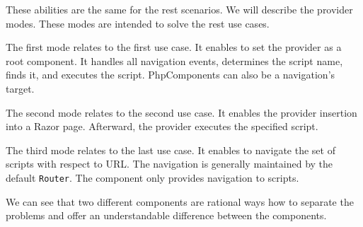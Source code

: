 These abilities are the same for the rest scenarios.
We will describe the provider modes.
These modes are intended to solve the rest use cases. 
\par
The first mode relates to the first use case.
It enables to set the provider as a root component.
It handles all navigation events, determines the script name, finds it, and executes the script.
PhpComponents can also be a navigation's target.
\par
The second mode relates to the second use case.
It enables the provider insertion into a Razor page.
Afterward, the provider executes the specified script.
\par
The third mode relates to the last use case.
It enables to navigate the set of scripts with respect to URL.
The navigation is generally maintained by the default \texttt{Router}.
The component only provides navigation to scripts.
\par
We can see that two different components are rational ways how to separate the problems and offer an understandable difference between the components.


